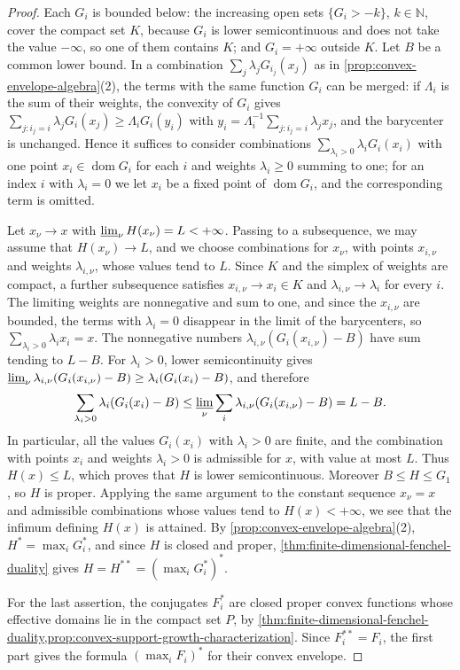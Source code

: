 \begin{proof}
Each $G_i$ is bounded below: the increasing open sets $\{G_i>-k\}$, $k\in\mathbb N$, cover the compact set $K$, because $G_i$ is lower semicontinuous and does not take the value $-\infty$, so one of them contains $K$; and $G_i=+\infty$ outside $K$. Let $B$ be a common lower bound. In a combination $\sum_j\lambda_jG_{i_j}(x_j)$ as in \cref{prop:convex-envelope-algebra}(2), the terms with the same function $G_i$ can be merged: if $\Lambda_i$ is the sum of their weights, the convexity of $G_i$ gives $\sum_{j:i_j=i}\lambda_jG_i(x_j)\geq\Lambda_iG_i(y_i)$ with $y_i=\Lambda_i^{-1}\sum_{j:i_j=i}\lambda_jx_j$, and the barycenter is unchanged. Hence it suffices to consider combinations $\sum_{\lambda_i>0}\lambda_iG_i(x_i)$ with one point $x_i\in\operatorname{dom}G_i$ for each $i$ and weights $\lambda_i\geq0$ summing to one; for an index $i$ with $\lambda_i=0$ we let $x_i$ be a fixed point of $\operatorname{dom}G_i$, and the corresponding term is omitted.

Let $x_\nu\to x$ with $\varliminf_\nu H(x_\nu)=L<+\infty$. Passing to a subsequence, we may assume that $H(x_\nu)\to L$, and we choose combinations for $x_\nu$, with points $x_{i,\nu}$ and weights $\lambda_{i,\nu}$, whose values tend to $L$. Since $K$ and the simplex of weights are compact, a further subsequence satisfies $x_{i,\nu}\to x_i\in K$ and $\lambda_{i,\nu}\to\lambda_i$ for every $i$. The limiting weights are nonnegative and sum to one, and since the $x_{i,\nu}$ are bounded, the terms with $\lambda_i=0$ disappear in the limit of the barycenters, so $\sum_{\lambda_i>0}\lambda_ix_i=x$. The nonnegative numbers $\lambda_{i,\nu}(G_i(x_{i,\nu})-B)$ have sum tending to $L-B$. For $\lambda_i>0$, lower semicontinuity gives $\varliminf_\nu\lambda_{i,\nu}(G_i(x_{i,\nu})-B)\geq\lambda_i(G_i(x_i)-B)$, and therefore
\[
 \sum_{\lambda_i>0}\lambda_i(G_i(x_i)-B)
 \leq \varliminf_\nu\sum_i
       \lambda_{i,\nu}(G_i(x_{i,\nu})-B)=L-B.
\]
In particular, all the values $G_i(x_i)$ with $\lambda_i>0$ are finite, and the combination with points $x_i$ and weights $\lambda_i>0$ is admissible for $x$, with value at most $L$. Thus $H(x)\leq L$, which proves that $H$ is lower semicontinuous. Moreover $B\leq H\leq G_1$, so $H$ is proper. Applying the same argument to the constant sequence $x_\nu=x$ and admissible combinations whose values tend to $H(x)<+\infty$, we see that the infimum defining $H(x)$ is attained. By \cref{prop:convex-envelope-algebra}(2), $H^*=\max_iG_i^*$, and since $H$ is closed and proper, \cref{thm:finite-dimensional-fenchel-duality} gives $H=H^{**}=(\max_iG_i^*)^*$.

For the last assertion, the conjugates $F_i^*$ are closed proper convex functions whose effective domains lie in the compact set $P$, by \cref{thm:finite-dimensional-fenchel-duality,prop:convex-support-growth-characterization}. Since $F_i^{**}=F_i$, the first part gives the formula $(\max_iF_i)^*$ for their convex envelope.
\end{proof}

